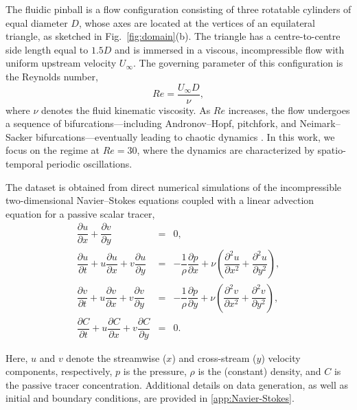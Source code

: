 \documentclass{article}
\begin{document}
The fluidic pinball is a flow configuration consisting of three rotatable cylinders of equal diameter $D$, whose axes are located at the vertices of an equilateral triangle, as sketched in Fig.~\ref{fig:domain}(b). The triangle has a centre-to-centre side length equal to $1.5D$ and is immersed in a viscous, incompressible flow with uniform upstream velocity $U_\infty$. The governing parameter of this configuration is the Reynolds number,
\begin{equation}
Re = \dfrac{U_\infty D}{\nu},
\end{equation}
where $\nu$ denotes the fluid kinematic viscosity. As $Re$ increases, the flow undergoes a sequence of bifurcations—including Andronov--Hopf, pitchfork, and Neimark--Sacker bifurcations—eventually leading to chaotic dynamics \cite{Deng_Noack_2020}. In this work, we focus on the regime at $Re = 30$, where the dynamics are characterized by spatio-temporal periodic oscillations.

The dataset is obtained from direct numerical simulations of the incompressible two-dimensional Navier--Stokes equations coupled with a linear advection equation for a passive scalar tracer,
\begin{subequations}
	\begin{eqnarray}
	\dfrac{\partial u}{\partial x} + \dfrac{\partial v}{\partial y} &=& 0, \label{eq:continuity} \\
	\dfrac{\partial u}{\partial t} + u \dfrac{\partial u}{\partial x} + v \dfrac{\partial u}{\partial y} &=& 
	-\dfrac{1}{\rho}\dfrac{\partial p}{\partial x} + \nu\left(\dfrac{\partial^2 u}{\partial x^2} + \dfrac{\partial^2 u}{\partial y^2}\right), \label{eq:momentum_u} \\
	\dfrac{\partial v}{\partial t} + u \dfrac{\partial v}{\partial x} + v \dfrac{\partial v}{\partial y} &=& 
	-\dfrac{1}{\rho}\dfrac{\partial p}{\partial y} + \nu\left(\dfrac{\partial^2 v}{\partial x^2} + \dfrac{\partial^2 v}{\partial y^2}\right), \label{eq:momentum_v} \\
	\dfrac{\partial C}{\partial t} + u \dfrac{\partial C}{\partial x} + v \dfrac{\partial C}{\partial y} &=& 0. \label{eq:advection_f}
	\end{eqnarray}
\end{subequations}

Here, $u$ and $v$ denote the streamwise ($x$) and cross-stream ($y$) velocity components, respectively, $p$ is the pressure, $\rho$ is the (constant) density, and $C$ is the passive tracer concentration. Additional details on data generation, as well as initial and boundary conditions, are provided in \ref{app:Navier-Stokes}.
\end{document}
